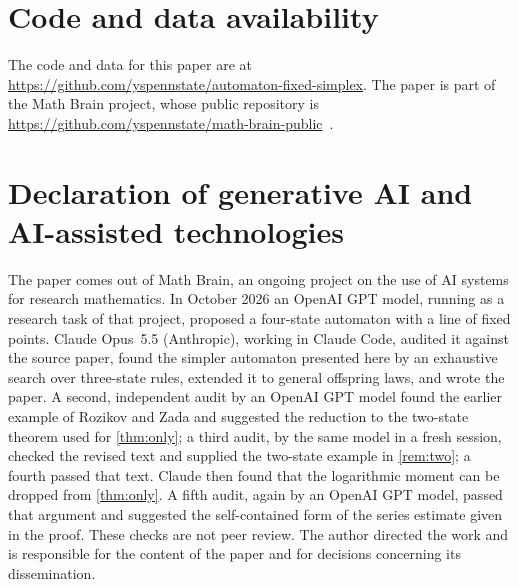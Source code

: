 \documentclass[11pt]{amsart}
\theoremstyle{remark}
\begin{document}
\section*{Code and data availability}
The code and data for this paper are at \url{https://github.com/yspennstate/automaton-fixed-simplex}. The paper is part of the Math Brain project, whose public repository is \url{https://github.com/yspennstate/math-brain-public}~\cite{MathBrainRepo}.

\section*{Declaration of generative AI and AI-assisted technologies}
The paper comes out of Math Brain, an ongoing project on the use of AI systems for research mathematics. In October 2026 an OpenAI GPT model, running as a research task of that project, proposed a four-state automaton with a line of fixed points. Claude Opus~5.5 (Anthropic), working in Claude Code, audited it against the source paper, found the simpler automaton presented here by an exhaustive search over three-state rules, extended it to general offspring laws, and wrote the paper. A second, independent audit by an OpenAI GPT model found the earlier example of Rozikov and Zada and suggested the reduction to the two-state theorem used for \cref{thm:only}; a third audit, by the same model in a fresh session, checked the revised text and supplied the two-state example in \cref{rem:two}; a fourth passed that text. Claude then found that the logarithmic moment can be dropped from \cref{thm:only}. A fifth audit, again by an OpenAI GPT model, passed that argument and suggested the self-contained form of the series estimate given in the proof. These checks are not peer review. The author directed the work and is responsible for the content of the paper and for decisions concerning its dissemination.



\end{document}
